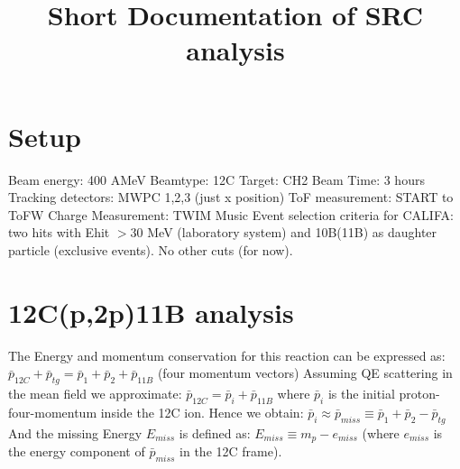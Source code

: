 \documentclass{report}
\title{Short Documentation of SRC analysis}
\begin{document}
\maketitle

\section{Setup}
Beam energy: 400 AMeV\newline
Beamtype: 12C\newline
Target: CH2\newline
Beam Time: 3 hours\newline
Tracking detectors: MWPC 1,2,3 (just x position)\newline
ToF measurement: START to ToFW\newline
Charge Measurement: TWIM Music\newline
Event selection criteria for CALIFA: two hits with E\textunderscore hit $> 30$ MeV (laboratory system) and 10B(11B) as daughter particle (exclusive events).\newline
No other cuts (for now).\newline

\section{12C(p,2p)11B analysis}
The Energy and momentum conservation for this reaction can be expressed as:\newline
$\bar{p}_{12C} + \bar{p}_{tg} = \bar{p}_{1} + \bar{p}_{2} + \bar{p}_{11B}$ (four momentum vectors) \newline
Assuming QE scattering in the mean field we approximate:\newline
$\bar{p}_{12C} = \bar{p}_{i} + \bar{p}_{11B}$ where $\bar{p}_{i}$ is the initial proton-four-momentum inside the 12C ion.\newline
Hence we obtain:\newline
$\bar{p}_{i} \approx \bar{p}_{miss} \equiv \bar{p}_{1} + \bar{p}_{2} - \bar{p}_{tg}$ \newline
And the missing Energy $E_{miss}$ is defined as:\newline
$E_{miss} \equiv m_{p} - e_{miss}$ (where $e_{miss}$ is the energy component of $\bar{p}_{miss}$ in the 12C frame).\newline
\end{document}
